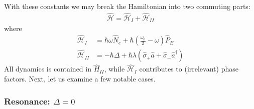 \documentclass{book}
\theoremstyle{definition}
\newcommand{\ham}{\mathcal{H}}
\newcommand{\f}[2]{\frac{#1}{#2}}
\newcommand{\lp}{\left(}
\newcommand{\rp}{\right)}
\begin{document}
With these constants we may break the Hamiltonian into two commuting parts:
\begin{align}
\hat{\ham} = \hat{\ham}_I + \hat{\ham}_{II}
\end{align}
where
\begin{align}
\hat{\ham}_I &= \hbar\omega \hat{N}_e + \hbar\lp \f{\omega_0}{2} - \omega \rp\hat{P}_E\\
\hat{\ham}_{II} &= -\hbar\Delta + \hbar \lambda \lp \hat{\sigma}_+ \hat{a}  + \hat{\sigma}_-\hat{a}^\dagger \rp
\end{align}
All dynamics is contained in $\hat{H}_{II}$, while $\hat{\ham}_I$ contributes to (irrelevant) phase factors. Next, let us examine a few notable cases. 

\subsubsection{Resonance: $\Delta = 0$}
\end{document}
